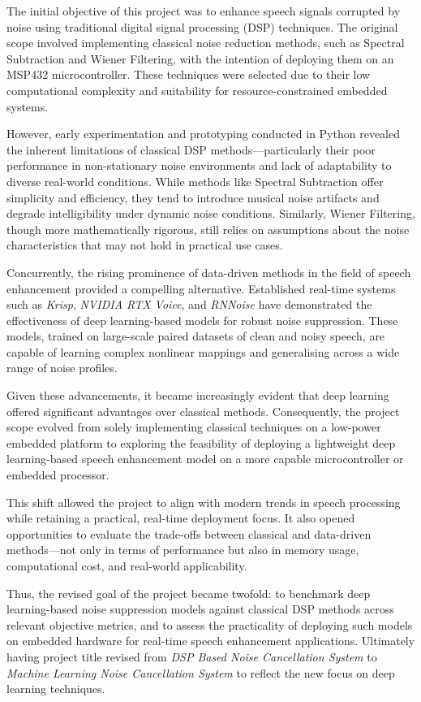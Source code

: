The initial objective of this project was to enhance speech signals corrupted by noise using traditional digital signal processing (DSP) techniques. The original scope involved implementing classical noise reduction methods, such as Spectral Subtraction and Wiener Filtering, with the intention of deploying them on an MSP432 microcontroller. These techniques were selected due to their low computational complexity and suitability for resource-constrained embedded systems.

However, early experimentation and prototyping conducted in Python revealed the inherent limitations of classical DSP methods—particularly their poor performance in non-stationary noise environments and lack of adaptability to diverse real-world conditions. While methods like Spectral Subtraction offer simplicity and efficiency, they tend to introduce musical noise artifacts and degrade intelligibility under dynamic noise conditions. Similarly, Wiener Filtering, though more mathematically rigorous, still relies on assumptions about the noise characteristics that may not hold in practical use cases.

Concurrently, the rising prominence of data-driven methods in the field of speech enhancement provided a compelling alternative. Established real-time systems such as \textit{Krisp}, \textit{NVIDIA RTX Voice}, and \textit{RNNoise} have demonstrated the effectiveness of deep learning-based models for robust noise suppression. These models, trained on large-scale paired datasets of clean and noisy speech, are capable of learning complex nonlinear mappings and generalising across a wide range of noise profiles.

Given these advancements, it became increasingly evident that deep learning offered significant advantages over classical methods. Consequently, the project scope evolved from solely implementing classical techniques on a low-power embedded platform to exploring the feasibility of deploying a lightweight deep learning-based speech enhancement model on a more capable microcontroller or embedded processor.

This shift allowed the project to align with modern trends in speech processing while retaining a practical, real-time deployment focus. It also opened opportunities to evaluate the trade-offs between classical and data-driven methods—not only in terms of performance but also in memory usage, computational cost, and real-world applicability.

Thus, the revised goal of the project became twofold: to benchmark deep learning-based noise suppression models against classical DSP methods across relevant objective metrics, and to assess the practicality of deploying such models on embedded hardware for real-time speech enhancement applications. Ultimately having project title revised from \textit{DSP Based Noise Cancellation System} to \textit{Machine Learning Noise Cancellation System} to reflect the new focus on deep learning techniques.
